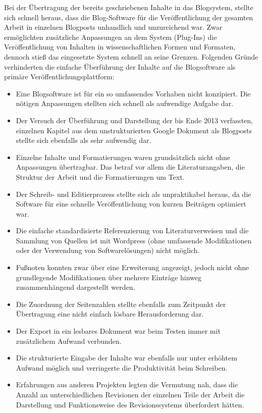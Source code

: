 Bei der Übertragung der bereits geschriebenen Inhalte in das Blogsystem, stellte sich schnell heraus, dass die Blog-Software für die Veröffentlichung der gesamten Arbeit in einzelnen Blogposts unhandlich und unzureichend war. Zwar ermöglichten zusätzliche Anpassungen an dem System (Plug-Ins) die Veröffentlichung von Inhalten in wissenschaftlichen Formen und Formaten, dennoch stieß das eingesetzte System schnell an seine Grenzen. Folgenden Gründe verhinderten die einfache Überführung der Inhalte auf die Blogsoftware als primäre Veröffentlichungsplattform:
\begin{itemize}
\item Eine Blogsoftware ist für ein so umfassendes Vorhaben nicht konzipiert. Die nötigen Anpassungen stellten sich schnell als aufwendige Aufgabe dar.
\item Der Versuch der Überführung und Darstellung der bis Ende 2013 verfassten, einzelnen Kapitel aus dem unstrukturierten Google Dokument als Blogposts stellte sich ebenfalls als sehr aufwendig dar.
\item  Einzelne Inhalte und Formatierungen waren grundsätzlich nicht ohne Anpassungen übertragbar. Das betraf vor allem die Literaturangaben, die Struktur der Arbeit und die Formatierungen um Text.
\item Der Schreib- und Editierprozess stellte sich als unpraktikabel heraus, da die Software für eine schnelle Veröffentlichung von kurzen Beiträgen optimiert war.
\item Die einfache standardisierte Referenzierung von Literaturverweisen und die Sammlung von Quellen ist mit Wordpress (ohne umfassende Modifikationen oder der Verwendung von Softwarelösungen) nicht möglich.
\item Fußnoten konnten zwar über eine Erweiterung angezeigt, jedoch nicht ohne grundlegende Modifikationen über mehrere Einträge hinweg zusammenhängend dargestellt werden.
\item Die Zuordnung der Seitenzahlen stellte ebenfalls zum Zeitpunkt der Übertragung eine nicht einfach lösbare Herausforderung dar.
\item Der Export in ein lesbares Dokument war beim Testen immer mit zusätzlichem Aufwand verbunden.
\item Die strukturierte Eingabe der Inhalte war ebenfalls nur unter erhöhtem Aufwand möglich und verringerte die Produktivität beim Schreiben.
\item Erfahrungen aus anderen Projekten legten die Vermutung nah, dass die Anzahl an unterschiedlichen Revisionen der einzelnen Teile der Arbeit die Darstellung und Funktionsweise des Revisionssystems überfordert hätten.
\end{itemize}

